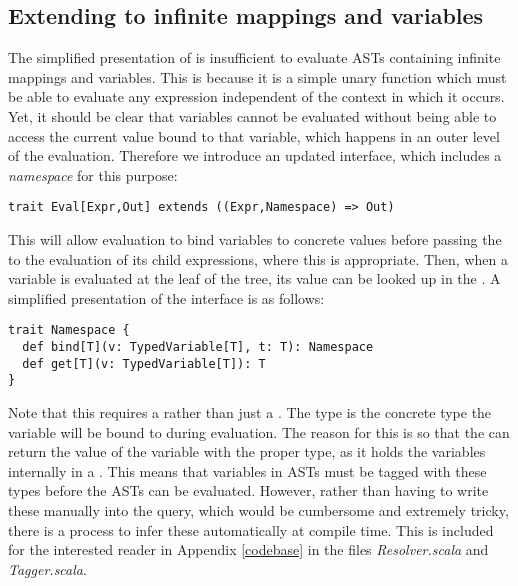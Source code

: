 \subsection{Extending to infinite mappings and variables}
The simplified presentation of  is insufficient to evaluate ASTs containing infinite mappings and variables. This is because it is a simple unary function which must be able to evaluate any expression independent of the context in which it occurs. Yet, it should be clear that variables cannot be evaluated without being able to access the current value bound to that variable, which happens in an outer level of the evaluation.
Therefore we introduce an updated interface, which includes a \textit{namespace} for this purpose:
\vs\begin{lstlisting}
trait Eval[Expr,Out] extends ((Expr,Namespace) => Out)
\end{lstlisting}\vs
This will allow evaluation to bind variables to concrete values before passing the  to the evaluation of its child expressions, where this is appropriate. Then, when a variable is evaluated at the leaf of the tree, its value can be looked up in the . A simplified presentation of the  interface is as follows:
\vs\begin{lstlisting}
trait Namespace {
  def bind[T](v: TypedVariable[T], t: T): Namespace
  def get[T](v: TypedVariable[T]): T
}
\end{lstlisting}\vs
Note that this requires a  rather than just a . The type  is the concrete type the variable will be bound to during evaluation. The reason for this is so that the  can return the value of the variable with the proper type, as it holds the variables internally in a . This means that variables in ASTs must be tagged with these types before the ASTs can be evaluated. However, rather than having to write these manually into the query, which would be cumbersome and extremely tricky, there is a process to infer these automatically at compile time. This is included for the interested reader in Appendix \ref{codebase} in the files \textit{Resolver.scala} and \textit{Tagger.scala}.

